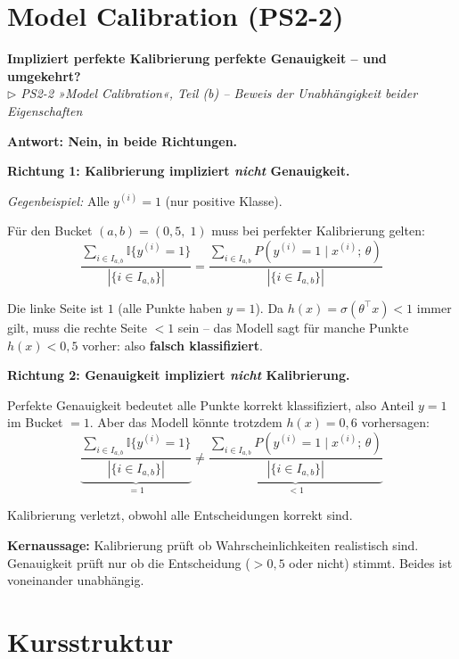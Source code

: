 \documentclass[11pt, a4paper]{article}
\newenvironment{frage}[2]{%
  \begin{tcolorbox}[frageboxstyle, title={Frage}]
  \textbf{#1}\\[3pt]
  {\small\itshape\color{black!55}\(\triangleright\) #2}
  \end{tcolorbox}
  \begin{tcolorbox}[antwortboxstyle]
}{%
  \end{tcolorbox}
  \vspace{4mm}
}
\begin{document}
\section{Model Calibration (PS2-2)}

\begin{frage}{Impliziert perfekte Kalibrierung perfekte Genauigkeit -- und umgekehrt?}{PS2-2 »Model Calibration«, Teil (b) -- Beweis der Unabhängigkeit beider Eigenschaften}

\textbf{Antwort: Nein, in beide Richtungen.}

\medskip
\textbf{Richtung 1: Kalibrierung impliziert \emph{nicht} Genauigkeit.}

\textit{Gegenbeispiel:} Alle $y^{(i)} = 1$ (nur positive Klasse).

Für den Bucket $(a, b) = (0{,}5,\; 1)$ muss bei perfekter Kalibrierung gelten:
\[
  \frac{\sum_{i \in I_{a,b}} \mathbb{I}\{y^{(i)}=1\}}{|\{i \in I_{a,b}\}|}
  = \frac{\sum_{i \in I_{a,b}} P(y^{(i)}=1 \mid x^{(i)};\,\theta)}{|\{i \in I_{a,b}\}|}
\]

Die linke Seite ist $1$ (alle Punkte haben $y=1$). Da $h(x) = \sigma(\theta^\top x) < 1$ immer gilt,
muss die rechte Seite $< 1$ sein -- das Modell sagt für manche Punkte $h(x) < 0{,}5$ vorher: also
\textbf{falsch klassifiziert}.

\medskip
\textbf{Richtung 2: Genauigkeit impliziert \emph{nicht} Kalibrierung.}

Perfekte Genauigkeit bedeutet alle Punkte korrekt klassifiziert, also Anteil $y=1$ im Bucket $= 1$.
Aber das Modell könnte trotzdem $h(x) = 0{,}6$ vorhersagen:
\[
  \underbrace{\frac{\sum_{i \in I_{a,b}} \mathbb{I}\{y^{(i)}=1\}}{|\{i \in I_{a,b}\}|}}_{= 1}
  \neq
  \underbrace{\frac{\sum_{i \in I_{a,b}} P(y^{(i)}=1 \mid x^{(i)};\,\theta)}{|\{i \in I_{a,b}\}|}}_{< 1}
\]

Kalibrierung verletzt, obwohl alle Entscheidungen korrekt sind.

\medskip
\textbf{Kernaussage:} Kalibrierung prüft ob Wahrscheinlichkeiten realistisch sind. Genauigkeit prüft
nur ob die Entscheidung ($> 0{,}5$ oder nicht) stimmt. Beides ist voneinander unabhängig.

\end{frage}

\section{Kursstruktur}
\end{document}
